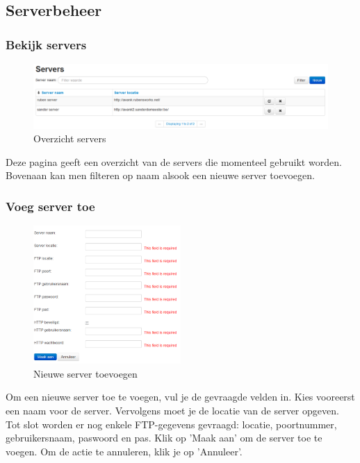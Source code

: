 \documentclass[]{article}
\begin{document}
\subsection{Serverbeheer}

\subsubsection{Bekijk servers}

\begin{figure}[!ht]
	\centering
	\includegraphics[width=1\textwidth]{img/server}
	\caption{Overzicht servers}
	\label{server}
\end{figure}

Deze pagina geeft een overzicht van de servers die momenteel gebruikt worden. Bovenaan kan men filteren op naam alsook een nieuwe server toevoegen.

\subsubsection{Voeg server toe}

\begin{figure}[!ht]
	\centering
	\includegraphics[width=0.5\textwidth]{img/new_server}
	\caption{Nieuwe server toevoegen}
	\label{new_server}
\end{figure}

Om een nieuwe server toe te voegen, vul je de gevraagde velden in. Kies vooreerst een naam voor de server. Vervolgens moet je de locatie van de server opgeven. Tot slot worden er nog enkele FTP-gegevens gevraagd: locatie, poortnummer, gebruikersnaam, paswoord en pas. Klik op 'Maak aan' om de server toe te voegen. Om de actie te annuleren, klik je op 'Annuleer'.
\end{document}
